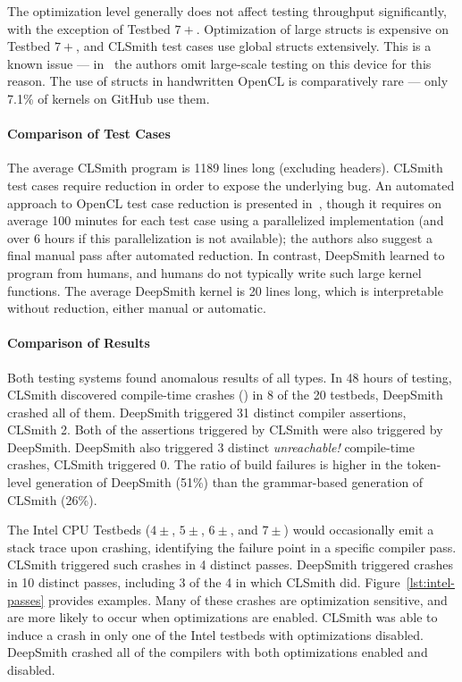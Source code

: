 The optimization level generally does not affect testing throughput
significantly, with the exception of Testbed $7+$. Optimization of large structs
is expensive on Testbed $7+$, and CLSmith test cases use global structs
extensively. This is a known issue --- in~\cite{Lidbury2015a} the authors omit
large-scale testing on this device for this reason. The use of structs in
handwritten OpenCL is comparatively rare --- only 7.1\% of kernels on GitHub use
them.


\paragraph{Comparison of Test Cases} %

The average CLSmith program is 1189 lines long (excluding headers). CLSmith test
cases require reduction in order to expose the underlying bug. An automated
approach to OpenCL test case reduction is presented in~\cite{Pflanzer2016},
though it requires on average 100 minutes for each test case using a
parallelized implementation (and over 6 hours if this parallelization is not
available); the authors also suggest a final manual pass after automated
reduction. In contrast, DeepSmith learned to program from humans, and humans do
not typically write such large kernel functions. The average DeepSmith kernel is
20 lines long, which is interpretable without reduction, either manual or
automatic.


\paragraph{Comparison of Results} %

Both testing systems found anomalous results of all types. In 48 hours of
testing, CLSmith discovered compile-time crashes (\bc) in 8 of the 20 testbeds,
DeepSmith crashed all of them. DeepSmith triggered 31 distinct compiler
assertions, CLSmith 2. Both of the assertions triggered by CLSmith were also
triggered by DeepSmith. DeepSmith also triggered 3 distinct \emph{unreachable!}
compile-time crashes, CLSmith triggered 0. The ratio of build failures is higher
in the token-level generation of DeepSmith (51\%) than the grammar-based
generation of CLSmith (26\%).

The Intel CPU Testbeds ($4\pm$, $5\pm$, $6\pm$, and $7\pm$) would occasionally
emit a stack trace upon crashing, identifying the failure point in a specific
compiler pass. CLSmith triggered such crashes in 4 distinct passes. DeepSmith
triggered crashes in 10 distinct passes, including 3 of the 4 in which CLSmith
did. Figure~\ref{lst:intel-passes} provides examples. Many of these crashes are
optimization sensitive, and are more likely to occur when optimizations are
enabled. CLSmith was able to induce a crash in only one of the Intel testbeds
with optimizations disabled. DeepSmith crashed all of the compilers with both
optimizations enabled and disabled.

